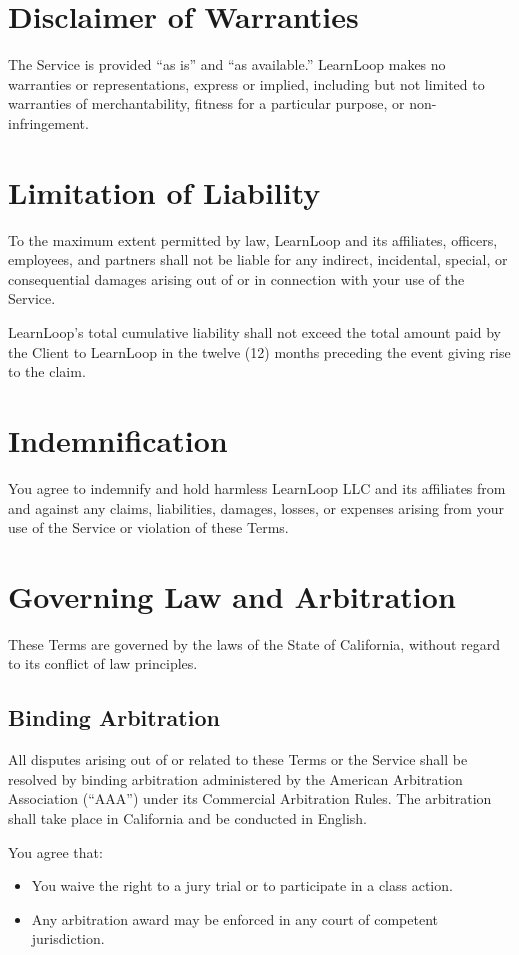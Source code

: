 \documentclass[12pt]{article}
\begin{document}
\section{Disclaimer of Warranties}
The Service is provided “as is” and “as available.” LearnLoop makes no warranties or representations, express or implied, including but not limited to warranties of merchantability, fitness for a particular purpose, or non-infringement.

\section{Limitation of Liability}
To the maximum extent permitted by law, LearnLoop and its affiliates, officers, employees, and partners shall not be liable for any indirect, incidental, special, or consequential damages arising out of or in connection with your use of the Service.

LearnLoop’s total cumulative liability shall not exceed the total amount paid by the Client to LearnLoop in the twelve (12) months preceding the event giving rise to the claim.

\section{Indemnification}
You agree to indemnify and hold harmless LearnLoop LLC and its affiliates from and against any claims, liabilities, damages, losses, or expenses arising from your use of the Service or violation of these Terms.

\section{Governing Law and Arbitration}
These Terms are governed by the laws of the State of California, without regard to its conflict of law principles.

\subsection{Binding Arbitration}
All disputes arising out of or related to these Terms or the Service shall be resolved by binding arbitration administered by the American Arbitration Association (“AAA”) under its Commercial Arbitration Rules. The arbitration shall take place in California and be conducted in English.

You agree that:
\begin{itemize}[leftmargin=*]
    \item You waive the right to a jury trial or to participate in a class action.
    \item Any arbitration award may be enforced in any court of competent jurisdiction.
\end{itemize}
\end{document}
